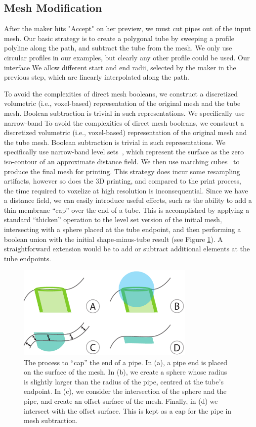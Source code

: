 \subsection{Mesh Modification}
After the maker hits "Accept" on her preview, we must cut pipes out of the input mesh.
Our basic strategy is to create a polygonal tube by sweeping a profile polyline
along the path, and subtract the tube from the mesh. We only use circular profiles
in our examples, but clearly any other profile could be used.  Our interface
We allow different start and end radii, selected by the maker in the previous step, which are linearly interpolated along the path.

To avoid the complexities of direct mesh booleans, we construct a discretized volumetric
(i.e., voxel-based) representation of the original mesh and the tube mesh. Boolean
subtraction is trivial in such representations. We specifically use narrow-band
To avoid the complexities of direct mesh booleans, we construct a discretized volumetric (i.e., voxel-based) representation of the original mesh and the tube mesh.  Boolean subtraction is trivial in such representations.  We specifically use narrow-band level sets~\cite{Museth04}, which represent the surface as the zero iso-contour of an
approximate distance field.
We then use marching cubes~\cite{Lorensen87} to produce the final mesh for printing.
This strategy does incur some resampling artifacts, however so does the 3D printing, and compared to the print process, the time required to voxelize at high resolution is inconsequential.
Since we have a distance field, we can easily introduce useful effects, such as the
ability to add a thin membrane ``cap'' over the end of a tube. 
This is accomplished by applying a standard ``thicken'' operation to the level set version
of the initial mesh, intersecting with a sphere placed at the tube endpoint, and then performing
a boolean union with the initial shape-minus-tube result (see Figure \ref{fig:cap}).
A straightforward extension would be to add or subtract additional elements at
the tube endpoints.

\begin{figure}[t]
\centering
    \includegraphics[width=3.4in]{figures/cap.pdf}
\caption{The process to ``cap'' the end of a pipe.  In (a), a pipe end is placed on the surface of the mesh.  In (b), we create a sphere whose radius is slightly larger than the radius of the pipe, centred at the tube's endpoint.  In (c), we consider the intersection of the sphere and the pipe, and create an offset surface of the mesh.  Finally, in (d) we intersect with the offset surface.  This is kept as a cap for the pipe in mesh subtraction.}
\label{fig:cap}
\end{figure}

